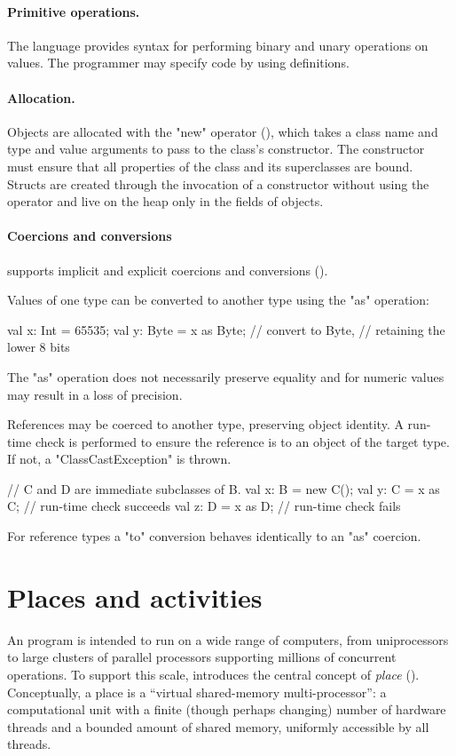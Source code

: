\paragraph{Primitive operations.}  The language provides syntax for performing
binary and unary operations on values. The programmer may specify code
by using  definitions. 


\paragraph{Allocation.}
Objects are allocated with the \xcd"new" operator
(), which takes a class name and type and value
arguments to pass to the class's constructor.  The constructor must
ensure that all properties of the class and its superclasses are
bound. Structs are created through the invocation of a constructor
without using the  operator and live on the heap only in 
the fields of objects.

\paragraph{Coercions and conversions}
\Xten{} supports implicit and explicit coercions and
conversions ().

Values of one type can be converted to another type using the
\xcd"as" operation:
\begin{xten}
val x: Int = 65535;
val y: Byte = x as Byte; // convert to Byte,
                         // retaining the lower 8 bits
\end{xten}
The \xcd"as" operation does not necessarily preserve equality
and for numeric values may 
result in a loss of precision.

References may be coerced to another type, preserving object
identity.  A run-time check is performed to ensure the reference
is to an object of the target type.  If not,
a \xcd"ClassCastException" is thrown.
\begin{xten}
// C and D are immediate subclasses of B.
val x: B = new C();
val y: C = x as C; // run-time check succeeds
val z: D = x as D; // run-time check fails
\end{xten}
For reference types a \xcd"to" conversion behaves identically to
an \xcd"as" coercion.

\section{Places and activities}
An \Xten{} program is intended to run on a wide range of computers,
from uniprocessors to large clusters of parallel processors supporting
millions of concurrent operations. To support this scale, \Xten{}
introduces the central concept of \emph{place} ().
Conceptually, a place is a ``virtual shared-memory multi-processor'':
a computational unit with a finite (though perhaps changing) number of
hardware threads and a bounded amount of shared memory, uniformly
accessible by all threads.


